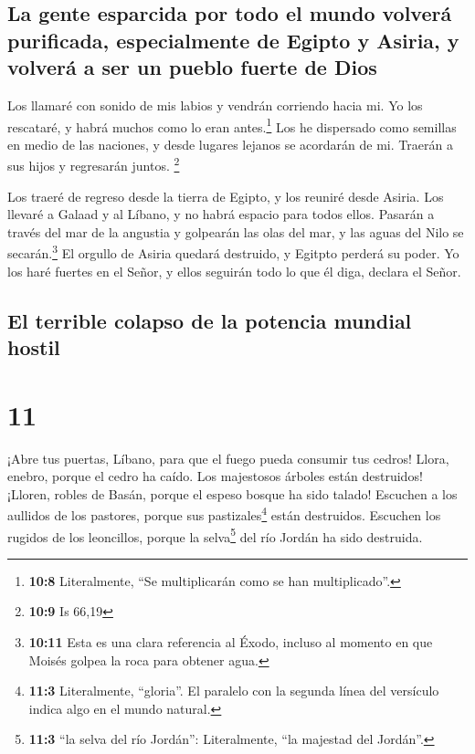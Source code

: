 \hypertarget{la-gente-esparcida-por-todo-el-mundo-volveruxe1-purificada-especialmente-de-egipto-y-asiria-y-volveruxe1-a-ser-un-pueblo-fuerte-de-dios}{%
\subsection{La gente esparcida por todo el mundo volverá purificada,
especialmente de Egipto y Asiria, y volverá a ser un pueblo fuerte de
Dios}\label{la-gente-esparcida-por-todo-el-mundo-volveruxe1-purificada-especialmente-de-egipto-y-asiria-y-volveruxe1-a-ser-un-pueblo-fuerte-de-dios}}

 Los llamaré con sonido de mis labios y vendrán corriendo
hacia mi. Yo los rescataré, y habrá muchos como lo eran
antes.\footnote{\textbf{10:8} Literalmente, ``Se multiplicarán como se
  han multiplicado''.}  Los he dispersado como semillas en
medio de las naciones, y desde lugares lejanos se acordarán de mi.
Traerán a sus hijos y regresarán juntos. \footnote{\textbf{10:9} Is
  66,19}

 Los traeré de regreso desde la tierra de Egipto, y los
reuniré desde Asiria. Los llevaré a Galaad y al Líbano, y no habrá
espacio para todos ellos.  Pasarán a través del mar de la
angustia y golpearán las olas del mar, y las aguas del Nilo se
secarán.\footnote{\textbf{10:11} Esta es una clara referencia al Éxodo,
  incluso al momento en que Moisés golpea la roca para obtener agua.} El
orgullo de Asiria quedará destruido, y Egitpto perderá su poder.
 Yo los haré fuertes en el Señor, y ellos seguirán todo
lo que él diga, declara el Señor.

\hypertarget{el-terrible-colapso-de-la-potencia-mundial-hostil}{%
\subsection{El terrible colapso de la potencia mundial
hostil}\label{el-terrible-colapso-de-la-potencia-mundial-hostil}}

\hypertarget{section-10}{%
\section{11}\label{section-10}}

 ¡Abre tus puertas, Líbano, para que el fuego pueda
consumir tus cedros!  Llora, enebro, porque el cedro ha
caído. Los majestosos árboles están destruidos! ¡Lloren, robles de
Basán, porque el espeso bosque ha sido talado!  Escuchen a
los aullidos de los pastores, porque sus pastizales\footnote{\textbf{11:3}
  Literalmente, ``gloria''. El paralelo con la segunda línea del
  versículo indica algo en el mundo natural.} están destruidos. Escuchen
los rugidos de los leoncillos, porque la selva\footnote{\textbf{11:3}
  ``la selva del río Jordán'': Literalmente, ``la majestad del Jordán''.}
del río Jordán ha sido destruida.

